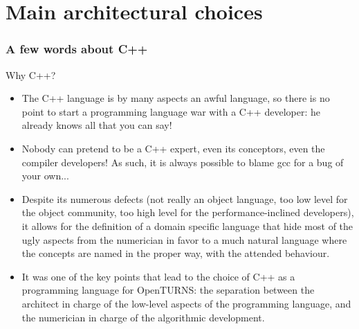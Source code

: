 \documentclass[8pt]{beamer}
\begin{document}
\section[Main architectural choices]{Main architectural choices}
\begin{frame}
  \frametitle{A few words about C++}
  \begin{block}{Why C++?}
    \begin{itemize}
    \item \alert{The C++ language is by many aspects an awful language}, so there is no point to start a programming language war with a C++ developer: he already knows all that you can say!
    \item Nobody can pretend to be a C++ expert, even its conceptors, even the compiler developers! As such, it is always possible to blame gcc for a bug of your own...
    \item Despite its numerous defects (not really an object language, too low level for the object community, too high level for the performance-inclined developers), it allows for the definition of a \alert{domain specific language} that hide most of the ugly aspects from the numerician in favor to a much natural language where the concepts are named in the proper way, with the attended behaviour.
    \item It was one of the key points that lead to the choice of C++ as a programming language for OpenTURNS: the separation between the architect in charge of the low-level aspects of the programming language, and the numerician in charge of the algorithmic development.
    \end{itemize}
  \end{block}
\end{frame}
\end{document}
